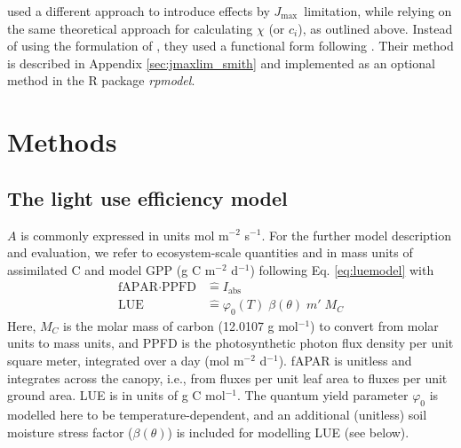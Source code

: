 \documentclass[gmd, manuscript]{copernicus}
\newcommand{\jmax}{$J_{\text{max}}$}
\begin{document}
\citet{smith19ecollett} used a different approach to introduce effects by \jmax\ limitation, while relying on the same theoretical approach for calculating $\chi$ (or $c_i$), as outlined above. Instead of using the formulation of \citet{smith37}, they used a functional form following \citet{farquhar80}. Their method is described in Appendix \ref{sec:jmaxlim_smith} and implemented as an optional method in the R package \textit{rpmodel}.

\section{Methods}
\label{sec:methods}

\subsection{The light use efficiency model}
\label{sec:luemodel}
$A$ is commonly expressed in units mol m$^{-2}$ s$^{-1}$. For the further model description and evaluation, we refer to ecosystem-scale quantities and in mass units of assimilated C and model GPP (g C m$^{-2}$ d$^{-1}$) following Eq. \ref{eq:luemodel}
with 
\begin{align}
    \label{eq:iabs_identification}
    \text{fAPAR} \cdot \text{PPFD} &\mathrel{\widehat{=}} I_{\text{abs}} \\
    \label{eq:lue_identification}
    \text{LUE} &\mathrel{\widehat{=}} \varphi_0(T) \; \beta(\theta) \; m' \; M_C
\end{align}
Here, $M_C$ is the molar mass of carbon (12.0107 g mol$^{-1}$) to convert from molar units to mass units, and PPFD is the photosynthetic photon flux density per unit square meter, integrated over a day (mol m$^{-2}$ d$^{-1}$). fAPAR is unitless and integrates across the canopy, i.e., from fluxes per unit leaf area to fluxes per unit ground area. LUE is in units of g C mol$^{-1}$. The quantum yield parameter $\varphi_0$ is modelled here to be temperature-dependent, and an additional (unitless) soil moisture stress factor ($\beta (\theta)$) is included for modelling LUE (see below).
\end{document}

